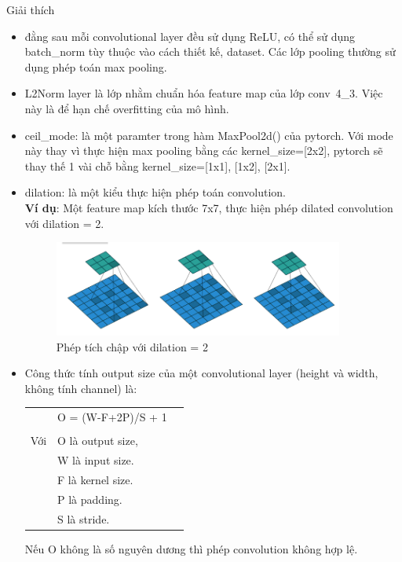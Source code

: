 \documentclass[a4paper]{report}
\begin{document}
Giải thích 
\begin{itemize}
	\item đằng sau mỗi convolutional layer đều sử dụng ReLU, có thể sử dụng batch\_norm tùy thuộc vào cách thiết kế, dataset. Các lớp pooling thường sử dụng phép toán max pooling.
	\item L2Norm layer là lớp nhằm chuẩn hóa feature map của lớp conv\ 4\_3. Việc này là để hạn chế overfitting của mô hình.
	\item ceil\_mode: là một paramter trong hàm MaxPool2d() của pytorch. Với mode này thay vì thực hiện max pooling bằng các kernel\_size=[2x2], pytorch sẽ thay thế 1 vài chỗ bằng kernel\_size={[1x1], [1x2], [2x1]}.
	\item dilation: là một kiểu thực hiện phép toán convolution.\\
		 \textbf{Ví dụ}: Một feature map kích thước 7x7, thực hiện phép dilated convolution với dilation = 2.
		 
		 \begin{figure}[h!]
			\centering
			\includegraphics[width=0.9\textwidth]{3_dilation.png}
			\caption[Caption for LOF]{Phép tích chập với dilation = 2 \cite{dilation}}
		\end{figure}

	\item Công thức tính output size của một convolutional layer (height và width, không tính channel) là:\\ 
			\begin{center}
				\begin{tabu}{clc}
					\rowfont{\color{blue}}
					& O = (W-F+2P)/S + 1 & \\
					\\
					Với & O là output size, & \\
						& W là input size. & \\
						& F là kernel size. & \\
						& P là padding. & \\
						& S là stride. & \\

				\end{tabu}
			\end{center}
			Nếu \color{blue} O \color{black} không là số nguyên dương thì phép convolution không hợp lệ.
\end{itemize}
\end{document}
